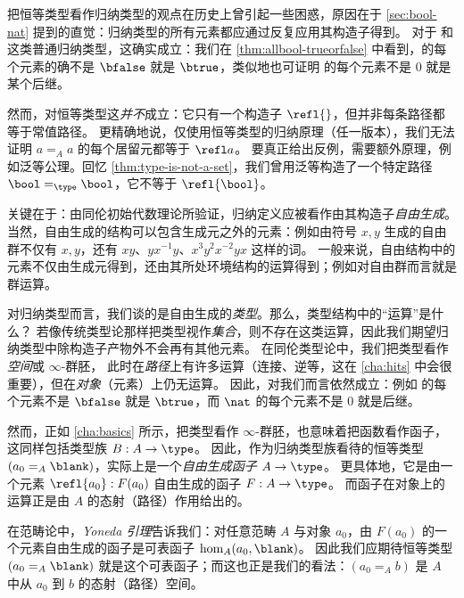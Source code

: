 把恒等类型看作归纳类型的观点在历史上曾引起一些困惑，原因在于 \cref{sec:bool-nat} 提到的直觉：归纳类型的所有元素都应通过反复应用其构造子得到。
对于 \bool 和 \nat 这类普通归纳类型，这确实成立：我们在 \cref{thm:allbool-trueorfalse} 中看到，\bool 的每个元素的确不是 $\bfalse$ 就是 $\btrue$，类似地也可证明 \nat 的每个元素不是 $0$ 就是某个后继。

然而，对恒等类型这\emph{并不}成立：它只有一个构造子 $\refl{}$，但并非每条路径都等于常值路径。
更精确地说，仅使用恒等类型的归纳原理（任一版本），我们无法证明 $a=_A a$ 的每个居留元都等于 $\refl a$。
要真正给出反例，需要额外原理，例如泛等公理。回忆 \cref{thm:type-is-not-a-set}，我们曾用泛等构造了一个特定路径 $\bool=_\type\bool$，它不等于 $\refl{\bool}$。

%
%
关键在于：由同伦初始代数理论所验证，归纳定义应被看作由其构造子\emph{自由生成}。
当然，自由生成的结构可以包含生成元之外的元素：例如由符号 $x,y$ 生成的自由群不仅有 $x,y$，还有 $xy$、$yx^{-1}y$、$x^3y^2x^{-2}yx$ 这样的词。
一般来说，自由结构中的元素不仅由生成元得到，还由其所处环境结构的运算得到；例如对自由群而言就是群运算。

对归纳类型而言，我们谈的是自由生成的\emph{类型}。那么，类型结构中的“运算”是什么？
若像传统类型论那样把类型视作\emph{集合}，则不存在这类运算，因此我们期望归纳类型中除构造子产物外不会再有其他元素。
在同伦类型论中，我们把类型看作\emph{空间}或 $\infty$-群胚，%
此时在\emph{路径}上有许多运算（连接、逆等，这在 \cref{cha:hits} 中会很重要），但在\emph{对象}（元素）上仍无运算。
因此，对我们而言依然成立：例如 \bool 的每个元素不是 $\bfalse$ 就是 $\btrue$，而 $\nat$ 的每个元素不是 $0$ 就是后继。

然而，正如 \cref{cha:basics} 所示，把类型看作 $\infty$-群胚，也意味着把函数看作函子，这同样包括类型族 $B:A\to\type$。
因此，作为归纳类型族看待的恒等类型 $(a_0 =_A \blank)$，实际上是一个\emph{自由生成函子} $A\to\type$。
更具体地，它是由一个元素 $\refl{a_0}: F(a_0)$ 自由生成的函子 $F:A\to\type$。
而函子在对象上的运算正是由 $A$ 的态射（路径）作用给出的。

在范畴论中，\emph{Yoneda 引理}告诉我们：对任意范畴 $A$ 与对象 $a_0$，由 $F(a_0)$ 的一个元素自由生成的函子是可表函子 $\hom_A(a_0,\blank)$。
因此我们应期待恒等类型 $(a_0 =_A \blank)$ 就是这个可表函子；而这也正是我们的看法：$(a_0 =_A b)$ 是 $A$ 中从 $a_0$ 到 $b$ 的态射（路径）空间。


